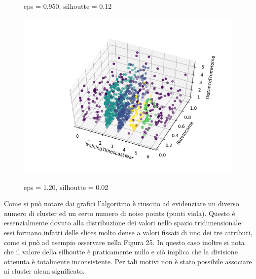 \documentclass[a4paper,9pt]{article}
\begin{document}
\begin{figure}[H]
\begin{minipage}[b]{0.45\textwidth}
\caption{eps = 0.950, silhoutte = 0.12 }
\label{etichetta2}
\centering
\includegraphics[width=\textwidth]{5 (2).png}
\caption{eps = 1.20, silhoutte = 0.02}
\label{etichetta2}
\end{minipage}
\end{figure}

Come si può notare dai grafici l'algoritmo è riuscito ad evidenziare un diverso numero di cluster ed un certo numero di noise points (punti viola). Questo è essenzialmente dovuto alla distribuzione dei valori nello spazio tridimensionale: essi formano infatti delle slices molto dense a valori fissati di uno dei tre attributi, come si può ad esempio osservare nella Figura  25. In questo caso inoltre si nota che il valore della silhoutte è praticamente nullo e ciò implica che la divisione ottenuta è totalmente inconsistente. Per tali motivi non è stato possibile associare ai cluster alcun significato.

\end{document}
